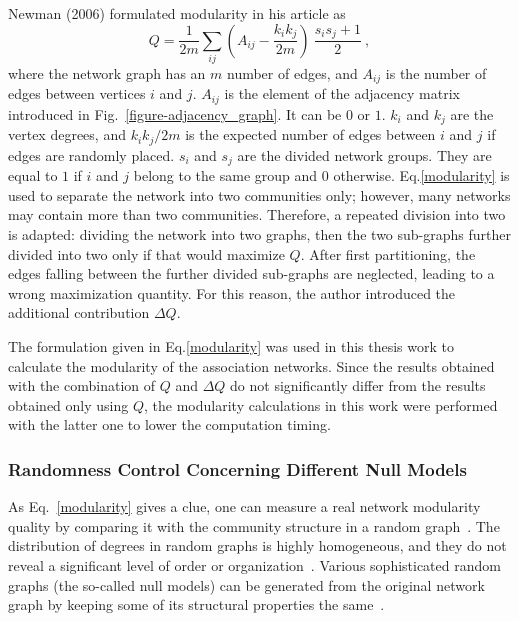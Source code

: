 Newman (2006) formulated modularity in his article as
\begin{equation} %
	Q = \frac {1} {2 m}\sum_ {ij} (A_{ij} - \frac {k_{i} k_{j}}{2 m}) \
	\frac {s_{i} s_{j} + 1} {2}\ ,
	\label{modularity}
\end{equation}
where the network graph has an $m$ number of edges, and $A_{ij}$ is the number of edges between vertices $i$ and $j$. $A_{ij}$ is the element of the adjacency matrix introduced in Fig.~\ref{figure-adjacency_graph}. It can be $0$ or $1$. $k_{i}$ and $k_{j}$ are the vertex degrees, and ${k_{i} k_{j}}/{2 m}$ is the expected number of edges between $i$ and $j$ if edges are randomly placed. $s_{i}$ and $s_{j}$ are the divided network groups. They are equal to $1$ if $i$ and $j$ belong to the same group and $0$ otherwise. Eq.\eqref{modularity} is used to separate the network into two communities only; however, many networks may contain more than two communities. Therefore, a repeated division into two is adapted: dividing the network into two graphs, then the two sub-graphs further divided into two only if that would maximize $Q$. After first partitioning, the edges falling between the further divided sub-graphs are neglected, leading to a wrong maximization quantity. For this reason, the author introduced the additional contribution $\Delta Q$.~\cite{Newman8577}

The formulation given in Eq.\eqref{modularity} was used in this thesis work to calculate the modularity of the association networks. Since the results obtained with the combination of $Q$ and $\Delta Q$ do not significantly differ from the results obtained only using $Q$, the modularity calculations in this work were performed with the latter one to lower the computation timing.

\subsubsection*{Randomness Control Concerning Different Null Models}
As Eq.~\eqref{modularity} gives a clue, one can measure a real network modularity quality by comparing it with the community structure in a random graph~\cite{GirvanNewman2004}. The distribution of degrees in random graphs is highly homogeneous, and they do not reveal a significant level of order or organization~\cite{FORTUNATO201075}. Various sophisticated random graphs (the so-called null models) can be generated from the original network graph by keeping some of its structural properties the same~\cite{MERTEN2020, FORTUNATO201075, Enders2018}.


